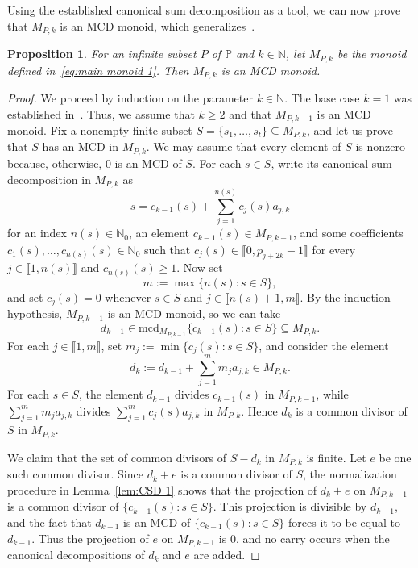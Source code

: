 \documentclass[10pt]{amsart}
\newtheorem{proposition}[theorem]{Proposition}
\theoremstyle{definition}
\theoremstyle{remark}
\numberwithin{equation}{section}
\newcommand{\nn}{\mathbb{N}}
\newcommand{\pp}{\mathbb{P}}
\newcommand{\mcd}{\mathrm{mcd}}
\providecommand\ldb{\llbracket}
\providecommand\rdb{\rrbracket}
\begin{document}
Using the established canonical sum decomposition as a tool, we can now prove that $M_{P,k}$ is an MCD monoid, which generalizes~\cite[Theorem~5.3]{LWZ24}.

\begin{proposition} \label{prop:MPk-is-MCD}
  For an infinite subset $P$ of $\pp$ and $k \in \nn$, let $M_{P,k}$ be the monoid defined in~\eqref{eq:main monoid 1}. Then $M_{P,k}$ is an MCD monoid.
\end{proposition}

\begin{proof}
  We proceed by induction on the parameter $k \in \nn$. The base case $k=1$ was established in~\cite[Theorem~5.3]{LWZ24}. Thus, we assume that $k \ge 2$ and that $M_{P,k-1}$ is an MCD monoid. Fix a nonempty finite subset $S = \{s_1, \dots, s_t\} \subseteq M_{P,k}$, and let us prove that $S$ has an MCD in $M_{P,k}$. We may assume that every element of $S$ is nonzero because, otherwise, $0$ is an MCD of $S$. For each $s \in S$, write its canonical sum decomposition in $M_{P,k}$ as
  \begin{equation}\label{eq:canon-sr}
    s = c_{k-1}(s) + \sum_{j=1}^{n(s)} c_j(s) a_{j,k}
  \end{equation}
  for an index $n(s) \in \nn_0$, an element $c_{k-1}(s) \in M_{P,k-1}$, and some coefficients $c_1(s), \dots, c_{n(s)}(s) \in \nn_0$ such that $c_j(s) \in \ldb 0, p_{j+2k} - 1 \rdb$ for every $j \in \ldb 1,n(s) \rdb$ and $c_{n(s)}(s) \ge 1$.
  Now set
  \[
    m := \max\{n(s) : s \in S\},
  \]
  and set $c_j(s)=0$ whenever $s \in S$ and $j \in \ldb n(s)+1,m \rdb$. By the induction hypothesis, $M_{P,k-1}$ is an MCD monoid, so we can take
  \[
    d_{k-1} \in \mcd_{M_{P,k-1}} \{c_{k-1}(s) : s \in S\} \subseteq M_{P,k}.
  \]
  For each $j \in \ldb 1,m \rdb$, set $m_j := \min\{c_j(s) : s \in S\}$, and consider the element
  \[
    d_k := d_{k-1} + \sum_{j=1}^m m_j a_{j,k} \in M_{P,k}.
  \]
  For each $s \in S$, the element $d_{k-1}$ divides $c_{k-1}(s)$ in $M_{P,k-1}$, while $\sum_{j=1}^m m_j a_{j,k}$ divides $\sum_{j=1}^m c_j(s) a_{j,k}$ in $M_{P,k}$. Hence $d_k$ is a common divisor of~$S$ in $M_{P,k}$.

  We claim that the set of common divisors of $S-d_k$ in $M_{P,k}$ is finite. Let $e$ be one such common divisor. Since $d_k+e$ is a common divisor of $S$, the normalization procedure in Lemma~\ref{lem:CSD 1} shows that the projection of $d_k+e$ on $M_{P,k-1}$ is a common divisor of $\{c_{k-1}(s) : s \in S\}$. This projection is divisible by $d_{k-1}$, and the fact that $d_{k-1}$ is an MCD of $\{c_{k-1}(s) : s \in S\}$ forces it to be equal to $d_{k-1}$. Thus the projection of $e$ on $M_{P,k-1}$ is $0$, and no carry occurs when the canonical decompositions of $d_k$ and $e$ are added.


\end{proof}
\end{document}
